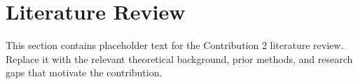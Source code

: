 \section{Literature Review}
\label{sec::contrib2::literature}

This section contains placeholder text for the Contribution 2 literature review. Replace it with the relevant theoretical background, prior methods, and research gaps that motivate the contribution.
